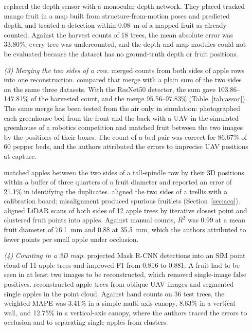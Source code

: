 \citet{bellocchio2022novel} replaced the depth sensor with a monocular depth network. They placed tracked mango fruit in a map built from structure-from-motion poses and predicted depth, and treated a detection within 0.08~m of a mapped fruit as already counted. Against the harvest counts of 18 trees, the mean absolute error was 33.80\%, every tree was undercounted, and the depth and map modules could not be evaluated because the dataset has no ground-truth depth or fruit positions.

\textit{(3) Merging the two sides of a row.} \citet{roy2019vision} merged counts from both sides of apple rows into one reconstruction. \citet{hani2020comparative} compared that merge with a plain sum of the two sides on the same three datasets. With the ResNet50 detector, the sum gave 103.86--147.81\% of the harvested count, and the merge 95.56--97.83\% (Table~\ref{tab:assoc}). The same merge has been tested from the air only in simulation: \citet{vasconcelos2024uav} photographed each greenhouse bed from the front and the back with a UAV in the simulated greenhouse of a robotics competition and matched fruit between the two images by the positions of their boxes. The count of a bed pair was correct for 86.67\% of 60 pepper beds, and the authors attributed the errors to imprecise UAV positions at capture.

\citet{gongal2016apple} matched apples between the two sides of a tall-spindle row by their 3D positions within a buffer of three quarters of a fruit diameter and reported an error of 21.1\% in identifying the duplicates. \citet{qureshi2023seeing} aligned the two sides of a trellis with a calibration board; misalignment produced spurious fruitlets (Section~\ref{sec:acq}). \citet{tsoulias2023situ} aligned LiDAR scans of both sides of 12 apple trees by iterative closest point and clustered fruit points into apples. Against manual counts, $R^2$ was 0.99 at a mean fruit diameter of 76.1~mm and 0.88 at 35.5~mm, which the authors attributed to fewer points per small apple under occlusion.

\textit{(4) Counting in a 3D map.} \citet{genemola2020fruitb} projected Mask R-CNN detections into an SfM point cloud of 11 apple trees and improved F1 from 0.816 to 0.881. A fruit had to be seen in at least two images to be reconstructed, which removed single-image false positives. \citet{dong2023three} reconstructed apple trees from oblique UAV images and segmented single apples in the point cloud. Against hand counts on 36 test trees, the weighted MAPE was 3.41\% in a simple multi-axis canopy, 8.63\% in a vertical wall, and 12.75\% in a vertical-axis canopy, where the authors traced the errors to occlusion and to separating single apples from clusters.

